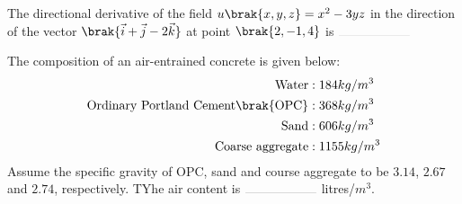 \iffalse
\chapter{2015}
\author{EE24BTECH11003}
\section{ae}
\fi
\item The directional derivative of the field $u\brak{x,y,z} = x^2 - 3yz$ in the direction of the vector $\brak{\vec{i} + \vec{j} - 2\vec{k}}$ at point $\brak{2,-1,4}$ is $\rule{2cm}{0.1pt}$
\hfill{}

\item The composition of an air-entrained concrete is given below:
\begin{align*}
\text{Water} &: 184 kg/m^3\\
\text{Ordinary Portland Cement}\brak{\text{OPC}} &: 368 kg/m^3\\
\text{Sand} &: 606 kg/m^3\\
\text{Coarse aggregate} &: 1155 kg/m^3\\
\end{align*}
Assume the specific gravity of OPC, sand and course aggregate to be $3.14$, $2.67$ and $2.74$, respectively. TYhe air content is $\rule{2cm}{0.1pt}$ litres/$m^3.$
\hfill{}

